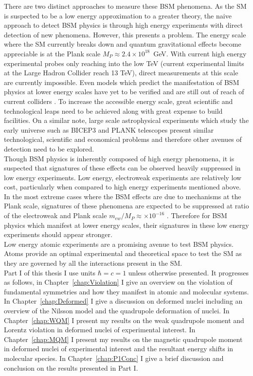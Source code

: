 \documentclass[10pt,a4paper, twoside, openright]{report}
\begin{document}
\linebreak
There are two distinct approaches to measure these BSM phenomena. As the SM is suspected to be a low energy approximation to a greater theory, the naive approach to detect BSM physics is through high energy experiments with direct detection of new phenomena. However, this presents a problem. The energy scale where the SM currently breaks down and quantum gravitational effects become appreciable is at the Plank scale $M_P \approx 2.4 \times 10^{18}$~GeV. With current high energy experimental probes only reaching into the low TeV (current experimental limits at the Large Hadron Collider reach 13 TeV), direct measurements at this scale are currently impossible. Even models which predict the manifestation of BSM physics at lower energy scales have yet to be verified and are still out of reach of current colliders \cite{Bechtle2015}. To increase the accessible energy scale, great scientific and technological leaps need to be achieved along with great expense to build facilities. On a similar note, large scale astrophysical experiments which study the early universe such as BICEP3\cite{BICEP3} and PLANK\cite{PLANK2016} telescopes present similar technological, scientific and economical problems and therefore other avenues of detection need to be explored. \\
\linebreak
Though BSM physics is inherently composed of high energy phenomena, it is suspected that signatures of these effects can be observed heavily suppressed in low energy experiments. Low energy,  electroweak experiments are relatively low cost, particularly when compared to high energy experiments mentioned above. In the most extreme cases where the BSM effects are due to mechanisms at the Plank scale, signatures of these phenomena are  expected to be suppressed at ratio of the electroweak and Plank scale $m_{ew}/M_P \approx \times 10^{-16}$  \cite{Kostelecky1995}. Therefore for BSM physics which manifest at lower energy scales, their signatures in these low energy experiments should appear stronger. \\
\linebreak
Low energy atomic experiments are a promising avenue to test BSM physics. Atoms provide an optimal experimental and theoretical space to test the SM as they are governed by all the interactions present in the SM. \\
\linebreak
Part I of this thesis I use units $\hbar=c=1$ unless otherwise presented. It progresses as follows, in Chapter~\ref{chap:Violation} I give an overview on the violation of fundamental symmetries and how  they manifest in atomic and molecular systems. In Chapter~\ref{chap:Deformed} I give a discussion on deformed nuclei including an overview of the Nilsson model and the quadrupole deformation of nuclei. In Chapter~\ref{chap:WQM} I present my results on the weak quadrupole moment and Lorentz violation in deformed nuclei of experimental interest. In Chapter~\ref{chap:MQM} I present my results on the magnetic quadrupole moment in deformed nuclei of experimental interest and the resultant energy shifts in molecular species. In Chapter~\ref{chap:P1Conc} I give a brief discussion and conclusion on the results presented in Part I. \\
\end{document}
